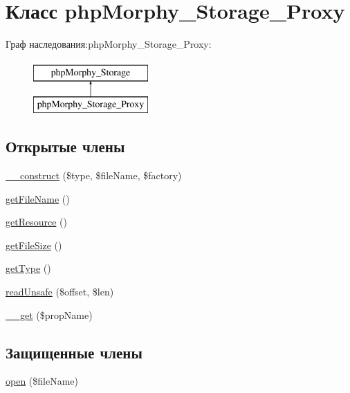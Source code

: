 \hypertarget{classphpMorphy__Storage__Proxy}{
\section{Класс phpMorphy\_\-Storage\_\-Proxy}
\label{classphpMorphy__Storage__Proxy}
}
Граф наследования:phpMorphy\_\-Storage\_\-Proxy:\begin{figure}[H]
\begin{center}
\leavevmode
\includegraphics[height=2.000000cm]{classphpMorphy__Storage__Proxy}
\end{center}
\end{figure}
\subsection*{Открытые члены}
\begin{DoxyCompactItemize}
\item 
\hyperlink{classphpMorphy__Storage__Proxy_a6a57a2de5287c24d32f9b302f4b7bf9b}{\_\-\_\-construct} (\$type, \$fileName, \$factory)
\item 
\hyperlink{classphpMorphy__Storage__Proxy_a8f05b79c8041985a515bdf370f7e3c20}{getFileName} ()
\item 
\hyperlink{classphpMorphy__Storage__Proxy_af336ae0aa2612e7bfb429e32abbd7480}{getResource} ()
\item 
\hyperlink{classphpMorphy__Storage__Proxy_a87b22571c152652e21d104aff333ec20}{getFileSize} ()
\item 
\hyperlink{classphpMorphy__Storage__Proxy_af4854a803e8ec3805d7216821c52a421}{getType} ()
\item 
\hyperlink{classphpMorphy__Storage__Proxy_a05be91d95fd76f03d64240102a17d635}{readUnsafe} (\$offset, \$len)
\item 
\hyperlink{classphpMorphy__Storage__Proxy_afc3e0a73b84bbbf50dc4fc5378e32256}{\_\-\_\-get} (\$propName)
\end{DoxyCompactItemize}
\subsection*{Защищенные члены}
\begin{DoxyCompactItemize}
\item 
\hyperlink{classphpMorphy__Storage__Proxy_aa3e1c1276d653bae382a68f5a86bd6ba}{open} (\$fileName)
\end{DoxyCompactItemize}
